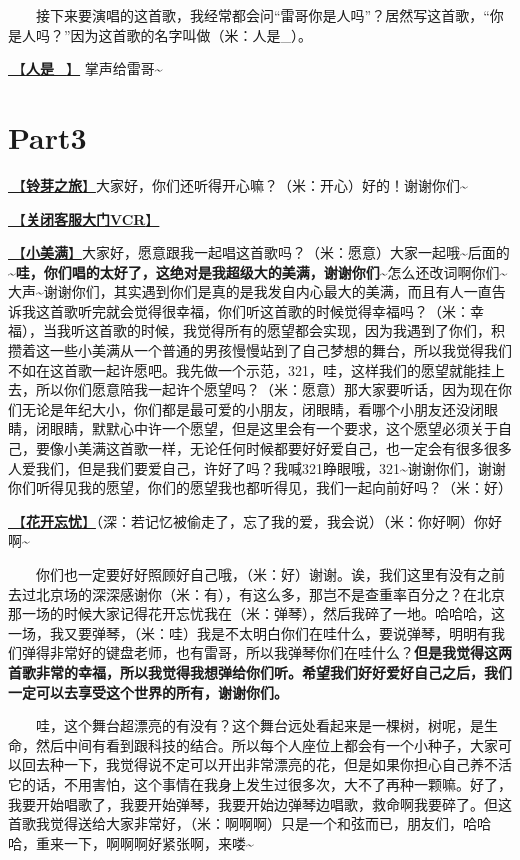\documentclass[]{ctexbook}
\begin{document}
  接下来要演唱的这首歌，我经常都会问``雷哥你是人吗''？居然写这首歌，``你是人吗？''因为这首歌的名字叫做（米：人是\_）。

\hyperref[renshi]{🎵【\textbf{人是\_}】} 掌声给雷哥\textasciitilde{}

\section{Part3}\label{shanghai-20240518-part3}

\hyperref[travel-lingya]{🎵【\textbf{铃芽之旅}】}大家好，你们还听得开心嘛？（米：开心）好的！谢谢你们\textasciitilde{}

\hyperref[close-door-vcr]{🎥【\textbf{关闭客服大门VCR}】}

\hyperref[happy-ending]{🎵【\textbf{小美满}】}大家好，愿意跟我一起唱这首歌吗？（米：愿意）大家一起哦\textasciitilde 后面的\textasciitilde{}\textbf{哇，你们唱的太好了，这绝对是我超级大的美满，谢谢你们\textasciitilde{}}怎么还改词啊你们\textasciitilde 大声\textasciitilde 谢谢你们，其实遇到你们是真的是我发自内心最大的美满，而且有人一直告诉我这首歌听完就会觉得很幸福，你们听这首歌的时候觉得幸福吗？（米：幸福），当我听这首歌的时候，我觉得所有的愿望都会实现，因为我遇到了你们，积攒着这一些小美满从一个普通的男孩慢慢站到了自己梦想的舞台，所以我觉得我们不如在这首歌一起许愿吧。我先做一个示范，321，哇，这样我们的愿望就能挂上去，所以你们愿意陪我一起许个愿望吗？（米：愿意）那大家要听话，因为现在你们无论是年纪大小，你们都是最可爱的小朋友，闭眼睛，看哪个小朋友还没闭眼睛，闭眼睛，默默心中许一个愿望，但是这里会有一个要求，这个愿望必须关于自己，要像小美满这首歌一样，无论任何时候都要好好爱自己，也一定会有很多很多人爱我们，但是我们要爱自己，许好了吗？我喊321睁眼哦，321\textasciitilde 谢谢你们，谢谢你们听得见我的愿望，你们的愿望我也都听得见，我们一起向前好吗？（米：好）

\hyperref[no-worries]{🎵【\textbf{花开忘忧}】}（深：若记忆被偷走了，忘了我的爱，我会说）（米：你好啊）你好啊\textasciitilde{}

  你们也一定要好好照顾好自己哦，（米：好）谢谢。诶，我们这里有没有之前去过北京场的深深感谢你（米：有），有这么多，那岂不是查重率百分之？在北京那一场的时候大家记得花开忘忧我在（米：弹琴），然后我碎了一地。哈哈哈，这一场，我又要弹琴，（米：哇）我是不太明白你们在哇什么，要说弹琴，明明有我们弹得非常好的键盘老师，也有雷哥，所以我弹琴你们在哇什么？\textbf{但是我觉得这两首歌非常的幸福，所以我觉得我想弹给你们听。希望我们好好爱好自己之后，我们一定可以去享受这个世界的所有，谢谢你们。}

  哇，这个舞台超漂亮的有没有？这个舞台远处看起来是一棵树，树呢，是生命，然后中间有看到跟科技的结合。所以每个人座位上都会有一个小种子，大家可以回去种一下，我觉得说不定可以开出非常漂亮的花，但是如果你担心自己养不活它的话，不用害怕，这个事情在我身上发生过很多次，大不了再种一颗嘛。好了，我要开始唱歌了，我要开始弹琴，我要开始边弹琴边唱歌，救命啊我要碎了。但这首歌我觉得送给大家非常好，（米：啊啊啊）只是一个和弦而已，朋友们，哈哈哈，重来一下，啊啊啊好紧张啊，来喽\textasciitilde{}
\end{document}
